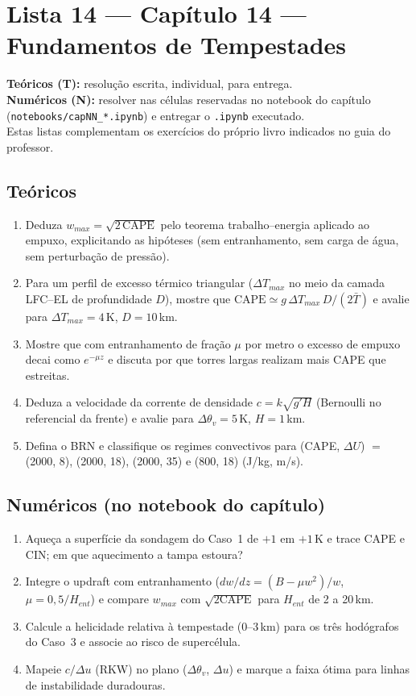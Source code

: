 \documentclass[11pt]{article}
\newcommand{\instrucoes}{%
\begin{caixalista}
\textbf{Teóricos (T):} resolução escrita, individual, para entrega.\\
\textbf{Numéricos (N):} resolver nas células reservadas no notebook do
capítulo (\texttt{notebooks/capNN\_*.ipynb}) e entregar o
\texttt{.ipynb} executado.\\
Estas listas complementam os exercícios do próprio livro indicados no
guia do professor.
\end{caixalista}}
\begin{document}
\clearpage
\section*{Lista 14 --- Capítulo 14 --- Fundamentos de Tempestades}
\instrucoes

\subsection*{Teóricos}

\begin{enumerate}[label=\textbf{T\arabic*.},itemsep=4pt]
  \item Deduza $w_{max} = \sqrt{2\,\mathrm{CAPE}}$ pelo teorema
        trabalho--energia aplicado ao empuxo, explicitando as
        hipóteses (sem entranhamento, sem carga de água, sem
        perturbação de pressão).
  \item Para um perfil de excesso térmico triangular ($\Delta T_{max}$
        no meio da camada LFC--EL de profundidade $D$), mostre que
        $\mathrm{CAPE} \simeq g\,\Delta T_{max}\,D/(2\bar T)$ e avalie
        para $\Delta T_{max} = 4$\,K, $D = 10$\,km.
  \item Mostre que com entranhamento de fração $\mu$ por metro o
        excesso de empuxo decai como $e^{-\mu z}$ e discuta por que
        torres largas realizam mais CAPE que estreitas.
  \item Deduza a velocidade da corrente de densidade
        $c = k\sqrt{g'H}$ (Bernoulli no referencial da frente) e
        avalie para $\Delta\theta_v = 5$\,K, $H = 1$\,km.
  \item Defina o BRN e classifique os regimes convectivos para
        (CAPE, $\Delta U$) $=$ (2000, 8), (2000, 18), (2000, 35) e
        (800, 18) (J/kg, m/s).
\end{enumerate}

\subsection*{Numéricos (no notebook do capítulo)}

\begin{enumerate}[label=\textbf{N\arabic*.},itemsep=4pt]
  \item Aqueça a superfície da sondagem do Caso~1 de $+1$ em $+1$\,K e
        trace CAPE e CIN; em que aquecimento a tampa estoura?
  \item Integre o updraft com entranhamento
        ($dw/dz = (B - \mu w^2)/w$, $\mu = 0{,}5/H_{ent}$) e compare
        $w_{max}$ com $\sqrt{2\mathrm{CAPE}}$ para $H_{ent}$ de 2 a
        20\,km.
  \item Calcule a helicidade relativa à tempestade (0--3\,km) para os
        três hodógrafos do Caso~3 e associe ao risco de supercélula.
  \item Mapeie $c/\Delta u$ (RKW) no plano
        ($\Delta\theta_v$, $\Delta u$) e marque a faixa ótima para
        linhas de instabilidade duradouras.
\end{enumerate}
\end{document}
